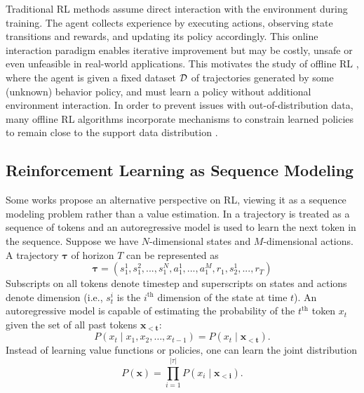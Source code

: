 Traditional RL methods assume direct interaction with the environment during training. The agent collects experience by executing actions, observing state transitions and rewards, and updating its policy accordingly. This online interaction paradigm enables iterative improvement but may be costly, unsafe or even unfeasible in real-world applications. This motivates the study of offline RL \cite{offline_rl_survey}, where the agent is given a fixed dataset ${\mathcal{D}}$ of trajectories generated by some (unknown) behavior policy, and must learn a policy without additional environment interaction. In order to prevent issues with out-of-distribution data, many offline RL algorithms incorporate mechanisms to constrain learned policies to remain close to the support data distribution \cite{kumar2020conservative}.

\subsection{Reinforcement Learning as Sequence Modeling}

Some works \cite{trajectory_transformers,decision_transformers} propose an alternative perspective on RL, viewing it as a sequence modeling problem rather than a value estimation. In \cite{trajectory_transformers} a trajectory is treated as a sequence of tokens and an autoregressive model is used to learn the next token in the sequence.
%
Suppose we have $N$-dimensional states and $M$-dimensional actions. A trajectory $\boldsymbol{\tau}$ of horizon $T$ can be represented as
\begin{equation}
\label{eq:trace_form}
\boldsymbol{\tau} = (s_1^1, s_1^2, ..., s_1^N, a_1^1, ..., a_1^M, r_1, s_2^1, ..., r_T)
\end{equation}
%
\noindent
Subscripts on all tokens denote timestep and superscripts on states and actions denote dimension (i.e., $s_t^i$ is the $i^\text{th}$ dimension of the state at time $t$). An autoregressive model is capable of estimating the probability of the $t^\text{th}$ token $x_{t}$ given the set of all past tokens $\boldsymbol{x_{<t}}$:
\begin{equation}
\label{eq:next_act_pred}
P(x_{t} \mid x_{1}, x_{2}, \dots, x_{t-1}) = P(x_{t} \mid \boldsymbol{x_{<t}}).
\end{equation}
%
\noindent
Instead of learning value functions or policies, one can learn the joint distribution
\begin{equation} \label{eq:seq_joint_prob}
P(\boldsymbol{x}) = \prod_{i=1}^{|\tau|} P(x_{i} \mid \boldsymbol{x_{<i}}).
\end{equation}

